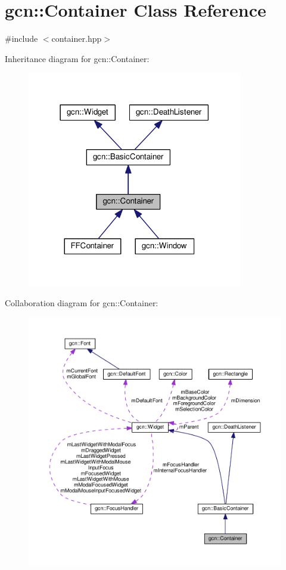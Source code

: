 \hypertarget{classgcn_1_1Container}{}\section{gcn\+:\+:Container Class Reference}
\label{classgcn_1_1Container}


{\ttfamily \#include $<$container.\+hpp$>$}



Inheritance diagram for gcn\+:\+:Container\+:\nopagebreak
\begin{figure}[H]
\begin{center}
\leavevmode
\includegraphics[width=266pt]{classgcn_1_1Container__inherit__graph}
\end{center}
\end{figure}


Collaboration diagram for gcn\+:\+:Container\+:\nopagebreak
\begin{figure}[H]
\begin{center}
\leavevmode
\includegraphics[width=350pt]{classgcn_1_1Container__coll__graph}
\end{center}
\end{figure}
